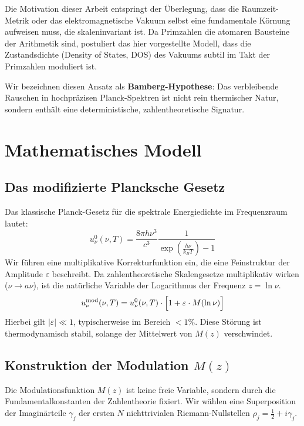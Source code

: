 \documentclass[11pt, a4paper]{article}
\begin{document}
	Die Motivation dieser Arbeit entspringt der Überlegung, dass die Raumzeit-Metrik oder das elektromagnetische Vakuum selbst eine fundamentale \glqq Körnung\grqq{} aufweisen muss, die skaleninvariant ist. Da Primzahlen die atomaren Bausteine der Arithmetik sind, postuliert das hier vorgestellte Modell, dass die Zustandsdichte (Density of States, DOS) des Vakuums subtil im Takt der Primzahlen moduliert ist.
	
	Wir bezeichnen diesen Ansatz als \textbf{Bamberg-Hypothese}: Das verbleibende Rauschen in hochpräzisen Planck-Spektren ist nicht rein thermischer Natur, sondern enthält eine deterministische, zahlentheoretische Signatur.
	
	\section{Mathematisches Modell}
	
	\subsection{Das modifizierte Plancksche Gesetz}
	Das klassische Planck-Gesetz für die spektrale Energiedichte im Frequenzraum lautet:
	\begin{equation}
		u_\nu^{0}(\nu,T) = \frac{8\pi h \nu^3}{c^3} \frac{1}{\exp\left(\frac{h\nu}{k_B T}\right)-1}
	\end{equation}
	Wir führen eine multiplikative Korrekturfunktion ein, die eine Feinstruktur der Amplitude $\varepsilon$ beschreibt. Da zahlentheoretische Skalengesetze multiplikativ wirken ($\nu \to a\nu$), ist die natürliche Variable der Logarithmus der Frequenz $z = \ln \nu$.
	\begin{equation}
		u_\nu^{\text{mod}}(\nu,T) = u_\nu^{0}(\nu,T) \cdot \Bigl[ 1 + \varepsilon \cdot M(\ln \nu) \Bigr]
	\end{equation}
	Hierbei gilt $|\varepsilon| \ll 1$, typischerweise im Bereich $< 1\%$. Diese Störung ist thermodynamisch stabil, solange der Mittelwert von $M(z)$ verschwindet.
	
	\subsection{Konstruktion der Modulation $M(z)$}
	Die Modulationsfunktion $M(z)$ ist keine freie Variable, sondern durch die Fundamentalkonstanten der Zahlentheorie fixiert. Wir wählen eine Superposition der Imaginärteile $\gamma_j$ der ersten $N$ nichttrivialen Riemann-Nullstellen $\rho_j = \frac{1}{2} + i\gamma_j$.
	
\end{document}

